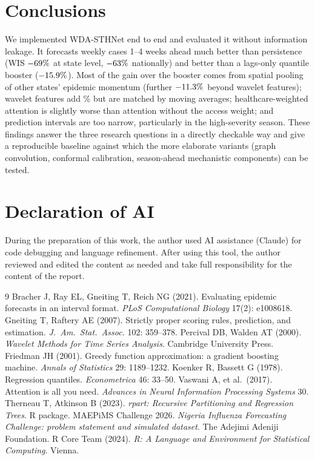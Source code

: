 \documentclass[11pt,a4paper]{article}
\begin{document}
\section{Conclusions}
We implemented WDA-STHNet end to end and evaluated it without information leakage. It forecasts weekly cases 1--4 weeks ahead much better than persistence (WIS $-69\%$ at state level, $-63\%$ nationally) and better than a lags-only quantile booster ($-15.9\%$). Most of the gain over the booster comes from spatial pooling of other states' epidemic momentum (further $-11.3\%$ beyond wavelet features); wavelet features add \gainWavLags\% but are matched by moving averages; healthcare-weighted attention is slightly worse than attention without the access weight; and prediction intervals are too narrow, particularly in the high-severity season. These findings answer the three research questions in a directly checkable way and give a reproducible baseline against which the more elaborate variants (graph convolution, conformal calibration, season-ahead mechanistic components) can be tested.

\section*{Declaration of AI}
During the preparation of this work, the author used AI assistance (Claude) for code debugging and language refinement. After using this tool, the author reviewed and edited the content as needed and take full responsibility for the content of the report.
\begin{thebibliography}{9}
 Bracher J, Ray EL, Gneiting T, Reich NG (2021). Evaluating epidemic forecasts in an interval format. \emph{PLoS Computational Biology} 17(2): e1008618.
 Gneiting T, Raftery AE (2007). Strictly proper scoring rules, prediction, and estimation. \emph{J.\ Am.\ Stat.\ Assoc.} 102: 359--378.
 Percival DB, Walden AT (2000). \emph{Wavelet Methods for Time Series Analysis}. Cambridge University Press.
 Friedman JH (2001). Greedy function approximation: a gradient boosting machine. \emph{Annals of Statistics} 29: 1189--1232.
 Koenker R, Bassett G (1978). Regression quantiles. \emph{Econometrica} 46: 33--50.
 Vaswani A, et al.\ (2017). Attention is all you need. \emph{Advances in Neural Information Processing Systems} 30.
 Therneau T, Atkinson B (2023). \emph{rpart: Recursive Partitioning and Regression Trees}. R package.
 MAEPiMS Challenge 2026. \emph{Nigeria Influenza Forecasting Challenge: problem statement and simulated dataset}. The Adejimi Adeniji Foundation.
 R Core Team (2024). \emph{R: A Language and Environment for Statistical Computing}. Vienna.
\end{thebibliography}

%
%
\end{document}
